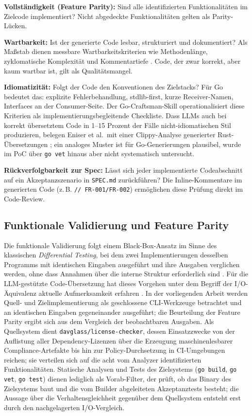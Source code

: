 \textbf{Vollständigkeit (Feature Parity):} Sind alle identifizierten Funktionalitäten im Zielcode implementiert? Nicht abgedeckte Funktionalitäten gelten als Parity-Lücken.

\textbf{Wartbarkeit:} Ist der generierte Code lesbar, strukturiert und dokumentiert? Als Maßstab dienen messbare Wartbarkeitskriterien wie Methodenlänge, zyklomatische Komplexität und Kommentartiefe \parencite{nunes2025maintainability}. Code, der zwar korrekt, aber kaum wartbar ist, gilt als Qualitätsmangel.

\textbf{Idiomatizität:} Folgt der Code den Konventionen des Zielstacks? Für Go bedeutet das: explizite Fehlerbehandlung, stdlib-first, kurze Receiver-Namen, Interfaces an der Consumer-Seite. Der Go-Craftsman-Skill operationalisiert diese Kriterien als implementierungsbegleitende Checkliste. Dass LLMs auch bei korrekt übersetztem Code in 1--15 Prozent der Fälle nicht-idiomatischen Stil produzieren, belegen Eniser et al.\ mit einer Clippy-Analyse generierter Rust-Übersetzungen \parencite{eniser2025realworld}; ein analoges Muster ist für Go-Generierungen plausibel, wurde im PoC über \texttt{go vet} hinaus aber nicht systematisch untersucht.

\textbf{Rückverfolgbarkeit zur Spec:} Lässt sich jeder implementierte Codeabschnitt auf ein Akzeptanzszenario in \texttt{SPEC.md} zurückführen? Die Inline-Kommentare im generierten Code (z.\,B. \texttt{// FR-001/FR-002}) ermöglichen diese Prüfung direkt im Code-Review.

\subsection{Funktionale Validierung und Feature Parity} \label{sec:funktionale-validierung}

Die funktionale Validierung folgt einem Black-Box-Ansatz im Sinne des klassischen \emph{Differential Testing}, bei dem zwei Implementierungen desselben Programms mit identischen Eingaben ausgeführt und ihre Ausgaben verglichen werden, ohne dass Annahmen über die interne Struktur erforderlich sind \parencite{mckeeman1998differentialtesting}. Für die LLM-gestützte Code-Übersetzung hat dieses Vorgehen unter dem Begriff der I/O-Äquivalenz aktuelle Aufmerksamkeit erfahren \parencite{eniser2025realworld}. In der vorliegenden Arbeit werden Quell- und Zielimplementierung als geschlossene CLI-Werkzeuge betrachtet und an identischen Eingaben gegeneinander ausgeführt; die Beurteilung der Feature Parity ergibt sich aus dem Vergleich der beobachtbaren Ausgaben. Als Quellsystem dient \texttt{davglass/license-checker}, dessen Einsatzzwecke von der Auflistung aller Dependency-Lizenzen über die Erzeugung maschinenlesbarer Compliance-Artefakte bis hin zur Policy-Durchsetzung in CI-Umgebungen reichen; sie verteilen sich auf die acht vom Analyzer identifizierten Funktionalitäten. Statische Analysen und Tests des Zielsystems (\texttt{go build}, \texttt{go vet}, \texttt{go test}) dienen lediglich als Vorab-Filter, der prüft, ob das Binary des Zielsystems baut und die vom Builder abgeleiteten Akzeptanztests besteht; die Aussage über die Verhaltensgleichheit gegenüber dem Quellsystem entsteht erst durch den nachgelagerten I/O-Vergleich.

